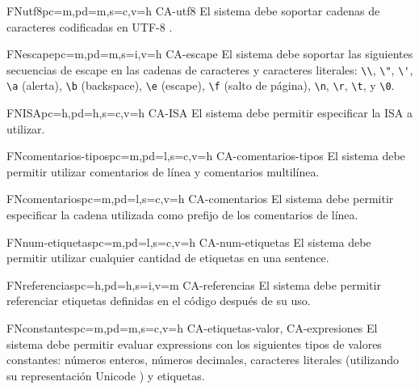 \begin{softwareReq}{FN}{utf8}{pc=m,pd=m,s=c,v=h}
    {CA-utf8}
    El sistema debe soportar cadenas de caracteres codificadas en UTF-8 \parencite{UTF-8}.
\end{softwareReq}

\begin{softwareReq}{FN}{escape}{pc=m,pd=m,s=i,v=h}
    {CA-escape}
    El sistema debe soportar las siguientes secuencias de escape en las cadenas
    de caracteres y caracteres literales: \verb!\\!, \verb!\"!, \verb!\'!,
    \verb!\a! (alerta), \verb!\b! (backspace), \verb!\e! (escape), \verb!\f!
    (salto de página), \verb!\n!, \verb!\r!, \verb!\t!, y \verb!\0!.
\end{softwareReq}

\begin{softwareReq}{FN}{ISA}{pc=h,pd=h,s=c,v=h}
    {CA-ISA}
    El sistema debe permitir especificar la \gls{ISA} a utilizar.
\end{softwareReq}

\begin{softwareReq}{FN}{comentarios-tipos}{pc=m,pd=l,s=c,v=h}
    {CA-comentarios-tipos}
    El sistema debe permitir utilizar comentarios de línea y comentarios
    multilínea.
\end{softwareReq}

\begin{softwareReq}{FN}{comentarios}{pc=m,pd=l,s=c,v=h}
    {CA-comentarios}
    El sistema debe permitir especificar la cadena utilizada como prefijo de los
    comentarios de línea.
\end{softwareReq}

\begin{softwareReq}{FN}{num-etiquetas}{pc=m,pd=l,s=c,v=h}
    {CA-num-etiquetas}
    El sistema debe permitir utilizar cualquier cantidad de etiquetas en una
    \gls{sentence}.
\end{softwareReq}

\begin{softwareReq}{FN}{referencias}{pc=h,pd=h,s=i,v=m}
    {CA-referencias}
    El sistema debe permitir referenciar etiquetas definidas en el
    código  después de su uso.
\end{softwareReq}

\begin{softwareReq}{FN}{constantes}{pc=m,pd=m,s=c,v=h}
    {CA-etiquetas-valor, CA-expresiones}
    El sistema debe permitir evaluar \glspl{expression} con los siguientes tipos
    de valores constantes: números enteros, números decimales, caracteres
    literales (utilizando su representación Unicode \parencite{UTF-8}) y etiquetas.
\end{softwareReq}

